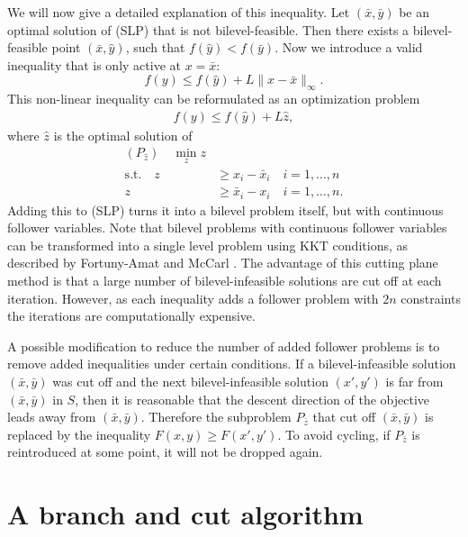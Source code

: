 \documentclass{article}
\begin{document}
We will now give a detailed explanation of this inequality. Let $(\bar x, \bar y)$ be an optimal solution of (SLP) that is not bilevel-feasible. Then there exists a bilevel-feasible point $(\bar x, \hat y)$, such that $f(\hat y) < f(\bar y)$. Now we introduce a valid inequality that is only active at $x = \bar x$:
\begin{equation*}
		f(y) \le f(\hat y) + L \|x-\bar x\|_{\infty}.
\end{equation*}
This non-linear inequality can be reformulated as an optimization problem 
\begin{align*}
f(y) \le f(\hat y) + L \hat z, 
\end{align*}
where $\hat z$ is the optimal solution of 
\begin{align*}
(P_{\hat z}) \quad \min_{z} z \\
\text{s.t.} \quad z &\ge x_i - \bar x_i \quad i = 1,\dots,n \\
z &\ge \bar x_i - x_i \quad i = 1,\dots,n.
\end{align*}
Adding this to (SLP) turns it into a bilevel problem itself, but with continuous follower variables.
Note that bilevel problems with continuous follower variables can be transformed into a single level problem using KKT conditions, as described by Fortuny-Amat
and McCarl \cite{Fortuny-Amat1981}.
The advantage of this cutting plane method is that a large number of bilevel-infeasible solutions are cut off at each iteration. However, as each inequality adds a follower problem with $2n$ constraints the iterations are computationally expensive.

A possible modification to reduce the number of added follower problems is to remove added inequalities under certain conditions. If a bilevel-infeasible solution $(\bar x, \bar y)$ was cut off and the next bilevel-infeasible solution $(x',y')$ is far from  $(\bar x, \bar y)$ in $S$, then it is reasonable that the descent direction of the objective leads away from $(\bar x, \bar y)$.
Therefore the subproblem $P_{\bar z}$ that cut off $(\bar x, \bar y)$ is replaced by the inequality $F(x,y) \ge F(x',y')$. To avoid cycling, if $P_{\bar z}$ is reintroduced at some point, it will not be dropped again.

\section{A branch and cut algorithm}
\end{document}

